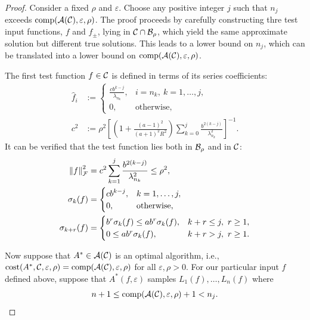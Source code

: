 \documentclass[graybox,footinfo]{svmult}
\newcommand{\DHJRnorm}[2][{}]{\ensuremath{\left \lVert #2 \right \rVert}_{#1}}
\begin{document}
\begin{proof}
Consider a fixed $\rho$ and $\varepsilon$.  Choose any positive integer $j$ such that $n_j$ exceeds $\textup{comp}({\mathcal{A}}({\mathcal{C}}),\varepsilon,\rho)$.  The proof proceeds by carefully constructing thre  test input functions, $f$ and $f_{\pm}$, lying in ${\mathcal{C}} \cap {\mathcal{B}}_{\rho}$, which yield the same approximate solution but different true solutions.  This leads to a lower bound on $n_j$, which can be translated into a lower bound on $\textup{comp}({\mathcal{A}}({\mathcal{C}}),\varepsilon,\rho)$. 

The first test function $f \in {\mathcal{C}}$ is defined in terms of its series coefficients:
\begin{align}
\nonumber
\widehat{f}_i &:= \begin{cases}
\displaystyle
\frac{c b^{k-j}}{\lambda_{n_{k}}},  & i =  n_{k}, \ k = 1, \ldots, j,
\\
0, & \text{otherwise},
\end{cases}
\\
\label{cdef}
c^2 &:=  \rho^2 \left[ \left(1+\frac{(a-1)^2}{(a+1)^{2} R^2 }\right)\sum_{k=0}^j \frac{b^{2(k-j)}}{\lambda_{n_{k}}^2}\right]^{-1}.
\end{align}
It can be verified that the test function lies both in ${\mathcal{B}}_{\rho}$ and in ${\mathcal{C}}$:
\begin{align}
\label{testfunnorm}
\DHJRnorm[\calF]{f}^2 &=  c^2\sum_{k=1}^j \frac{ b^{2(k-j)}}{\lambda^2_{n_{k}}} \le \rho^2,
\\
\nonumber
\sigma_k(f) &= \begin{cases}
\displaystyle
c b^{k-j}, & k =1, \ldots, j, \\
0, & \text{otherwise},
\end{cases}
\\
\nonumber
\sigma_{k+r}(f) &= \begin{cases}
\displaystyle 
b^{r} \sigma_k(f) \le a b^r \sigma_k(f), & k+r \le j, \ r \ge 1,
\\
0 \le a b^r \sigma_k(f), & k+r > j, \ r \ge 1.
\end{cases}
\end{align}

Now suppose that $A^* \in {\mathcal{A}}({\mathcal{C}})$ is an optimal algorithm, i.e., $\textup{cost}(A^*,{\mathcal{C}},\varepsilon,\rho) =  \textup{comp}({\mathcal{A}}({\mathcal{C}}),\varepsilon,\rho)$ for all $\varepsilon, \rho > 0$.  For our particular input $f$ defined above, suppose that $A^*(f,\varepsilon)$ samples $L_1(f), \ldots, L_n(f)$ where 
\[
n + 1\le \textup{comp}({\mathcal{A}}({\mathcal{C}}),\varepsilon,\rho) +1 < n_j.
\]  


\end{proof}
\end{document}
